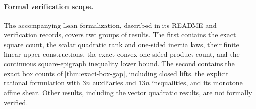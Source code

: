 \paragraph{Formal verification scope.}
The accompanying Lean formalization, described in its README and
verification records, covers two groups of results. The first contains
the exact square count, the scalar quadratic rank and one-sided inertia
laws, their finite linear upper constructions, the exact convex one-sided
product count, and the continuous square-epigraph inequality lower bound.
The second contains the exact box counts of \cref{thm:exact-box-gap},
including closed lifts, the explicit rational formulation with $3n$
auxiliaries and $13n$ inequalities, and its monotone affine shear. Other
results, including the vector quadratic results, are not formally
verified.
